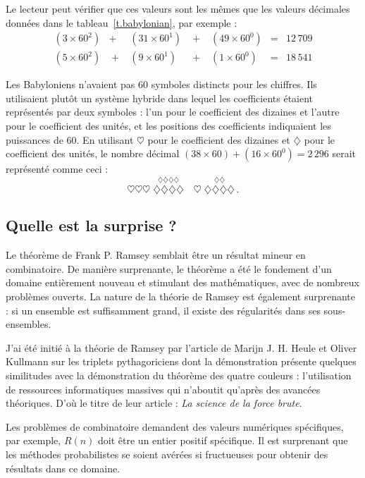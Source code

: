 Le lecteur peut vérifier que ces valeurs sont les mêmes que les valeurs décimales données dans le tableau~\ref{t.babylonian}, par exemple :
\[
\renewcommand{\arraystretch}{1.3}
\begin{array}{lclclcr}
(3\times 60^2) &+& (31\times 60^1) &\;+\;& (49\times 60^0) &=&   12\,709\\
(5\times 60^2) &\;+\;& (9\times 60^1) &\;+\;& (1\times 60^0) &=& 18\,541
\end{array}
\]

Les Babyloniens n'avaient pas $60$ symboles distincts pour les chiffres. Ils utilisaient plutôt un système hybride dans lequel les coefficients étaient représentés par deux symboles : l'un pour le coefficient des dizaines et l'autre pour le coefficient des unités, et les positions des coefficients indiquaient les puissances de 60. En utilisant $\heartsuit$ pour le coefficient des dizaines et $\diamondsuit$ pour le coefficient des unités, le nombre décimal $(38\times 60)+(16\times 60^0)=2\,296$ serait représenté comme ceci :
\[
\heartsuit\heartsuit\heartsuit \; \stackrel{\displaystyle\diamondsuit\diamondsuit\diamondsuit\diamondsuit}{\diamondsuit\diamondsuit\diamondsuit\diamondsuit}
\quad
\heartsuit \; \stackrel{\displaystyle\diamondsuit\diamondsuit}{\diamondsuit\diamondsuit\diamondsuit\diamondsuit}\,.
\]


\subsection*{Quelle est la surprise ?}

Le théorème de Frank P. Ramsey semblait être un résultat mineur en combinatoire. De manière surprenante, le théorème a été le fondement d'un domaine entièrement nouveau et stimulant des mathématiques, avec de nombreux problèmes ouverts. La nature de la théorie de Ramsey est également surprenante : si un ensemble est suffisamment grand, il existe des régularités dans ses sous-ensembles.

J'ai été initié à la théorie de Ramsey par l'article de Marijn J. H. Heule et Oliver Kullmann sur les triplets pythagoriciens dont la démonstration présente quelques similitudes avec la démonstration du théorème des quatre couleurs : l'utilisation de ressources informatiques massives qui n'aboutit qu'après des avancées théoriques. D'où le titre de leur article : \textit{La science de la force brute}.

Les problèmes de combinatoire demandent des valeurs numériques spécifiques, par exemple, $R(n)$ doit être un entier positif spécifique. Il est surprenant que les méthodes probabilistes se soient avérées si fructueuses pour obtenir des résultats dans ce domaine.

